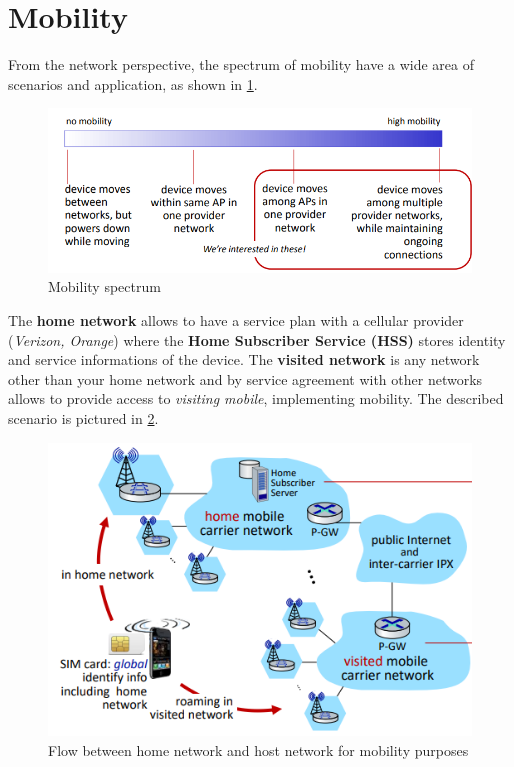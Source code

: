 \documentclass[10pt,a4paper]{report}
\theoremstyle{definition}
\begin{document}
\section{Mobility}\label{sec:mobility}
From the network perspective, the spectrum of mobility have a wide area of scenarios and application, as shown in \ref{mobility-scenario}.
\begin{figure}[h]
	\centering\includegraphics[scale=0.50]{images/Pasted image 20230308173344.png}
	\caption{Mobility spectrum}
	\label{mobility-scenario}
\end{figure}


The \textbf{home network} allows to have a service plan with a cellular provider (\textit{Verizon, Orange}) where the \textbf{Home Subscriber Service (HSS)} stores identity and service informations of the device. The \textbf{visited network} is any network other than your home network and by service agreement with other networks allows to provide access to \textit{visiting mobile}, implementing mobility. The described scenario is pictured in \ref{mobility-network}.

\begin{figure}[h]
	\centering
	\includegraphics[scale=0.50]{images/Pasted image 20230309174849.png}
	\caption{Flow between home network and host network for mobility purposes}
	\label{mobility-network}
\end{figure}
\end{document}
